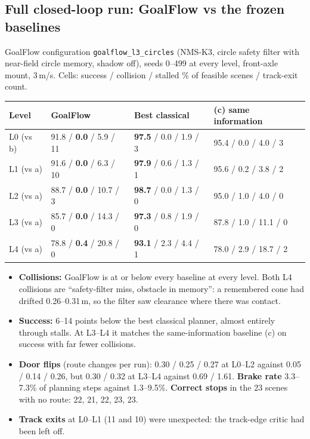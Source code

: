 \documentclass[11pt,a4paper]{article}
\newcommand{\code}[1]{\texttt{#1}}
\begin{document}
\subsection{Full closed-loop run: GoalFlow vs the frozen baselines}
\label{sec:fullrun}
GoalFlow configuration \code{goalflow\_l3\_circles} (NMS-K3, circle safety filter with near-field circle memory,
shadow off), seeds 0--499 at every level, front-axle mount, 3\,m/s. Cells: success / collision / stalled \% of
feasible scenes / track-exit count.
\begin{table}[H]
\small
\begin{tabularx}{\linewidth}{@{}lLLL@{}}
\toprule
Level & GoalFlow & Best classical & (c) same information \\
\midrule
L0 (vs b) & 91.8 / \textbf{0.0} / 5.9 / 11 & \textbf{97.5} / 0.0 / 1.9 / 3 & 95.4 / 0.0 / 4.0 / 3 \\
L1 (vs a) & 91.6 / \textbf{0.0} / 6.3 / 10 & \textbf{97.9} / 0.6 / 1.3 / 1 & 95.6 / 0.2 / 3.8 / 2 \\
L2 (vs a) & 88.7 / \textbf{0.0} / 10.7 / 3 & \textbf{98.7} / 0.0 / 1.3 / 0 & 95.0 / 1.0 / 4.0 / 0 \\
L3 (vs a) & 85.7 / \textbf{0.0} / 14.3 / 0 & \textbf{97.3} / 0.8 / 1.9 / 0 & 87.8 / 1.0 / 11.1 / 0 \\
L4 (vs a) & 78.8 / \textbf{0.4} / 20.8 / 0 & \textbf{93.1} / 2.3 / 4.4 / 1 & 78.0 / 2.9 / 18.7 / 2 \\
\bottomrule
\end{tabularx}
\end{table}
\begin{itemize}[nosep]
  \item \textbf{Collisions:} GoalFlow is at or below every baseline at every level. Both L4 collisions are
        ``safety-filter miss, obstacle in memory'': a remembered cone had drifted 0.26--0.31\,m, so the filter saw clearance
        where there was contact.
  \item \textbf{Success:} 6--14 points below the best classical planner, almost entirely through stalls. At L3--L4
        it matches the same-information baseline (c) on success with far fewer collisions.
  \item \textbf{Door flips} (route changes per run): 0.30 / 0.25 / 0.27 at L0--L2 against 0.05 / 0.14 / 0.26, but
        0.30 / 0.32 at L3--L4 against 0.69 / 1.61. \textbf{Brake rate} 3.3--7.3\% of planning steps against
        1.3--9.5\%. \textbf{Correct stops} in the 23 scenes with no route: 22, 21, 22, 23, 23.
  \item \textbf{Track exits} at L0--L1 (11 and 10) were unexpected: the track-edge critic had been left off.
\end{itemize}
\end{document}
